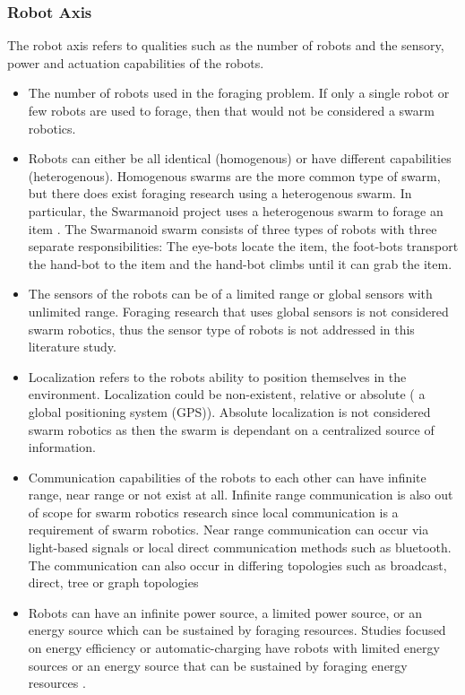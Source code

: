 \subsubsection{Robot Axis}
The robot axis refers to qualities such as  the number of robots and the sensory, power and actuation capabilities of the robots. 
\begin{itemize}
\item The number of robots used in the foraging problem. If only a single robot or few robots are used to forage, then that would not be considered a swarm robotics.

\item Robots can either be all identical (homogenous) or have different capabilities (heterogenous). Homogenous swarms are the more common type of swarm, but there does exist foraging research using a heterogenous swarm. In particular, the Swarmanoid project uses a heterogenous swarm to forage an item \cite{dorigo2013swarmanoid}. The Swarmanoid swarm consists of three types of robots with three separate responsibilities: The eye-bots locate the item, the foot-bots transport the hand-bot to the item and the hand-bot climbs until it can grab the item.

\item The sensors of the robots can be of a limited range or global sensors with unlimited range. Foraging research that uses global sensors is not considered swarm robotics, thus the sensor type of robots is not addressed in this literature study.

\item Localization refers to the robots ability to position themselves in the environment. Localization could be non-existent, relative or absolute ( a global positioning system (GPS)). Absolute localization is not considered swarm robotics as then the swarm is dependant on a centralized source of information. %

\item Communication capabilities of the robots to each other can have infinite range, near range or not exist at all. Infinite range communication is also out of scope for swarm robotics research since local communication is a requirement of swarm robotics. Near range communication can occur via light-based signals\cite{sugawara2002swarming} or local direct communication methods such as bluetooth. The communication can also occur in differing topologies such as broadcast, direct, tree or graph topologies \cite{dudek1993taxonomy}

\item Robots can have an infinite power source, a limited power source, or an energy source which can be sustained by foraging resources. Studies focused on energy efficiency or automatic-charging have robots with limited energy sources or an energy source that can be sustained by foraging energy resources \cite{liu2006strategies}.

\end{itemize}

